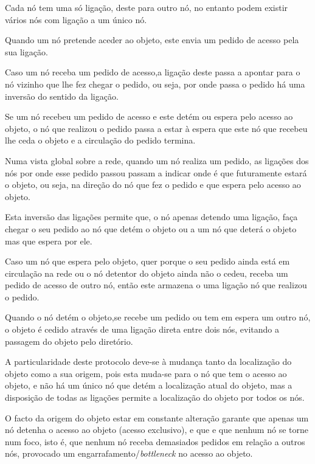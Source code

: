 Cada nó tem uma só ligação, deste para outro nó, no entanto podem existir vários nós com ligação a um único nó.

Quando um nó pretende aceder ao objeto, este envia um pedido de acesso pela sua ligação. 

Caso um nó receba um pedido de acesso,a ligação deste passa a apontar para o nó vizinho que lhe fez chegar o pedido, ou seja, por onde passa o pedido há uma inversão do sentido da ligação.

Se um nó recebeu um pedido de acesso e este detém ou espera pelo acesso ao objeto, o nó que realizou o pedido passa a estar à espera que este nó que recebeu lhe ceda o objeto e a circulação do pedido termina.


Numa vista global sobre a rede, quando um nó realiza um pedido, as ligações dos nós por onde esse pedido passou passam a indicar onde é que futuramente estará o objeto, ou seja, na direção do nó que fez o pedido e que espera pelo acesso ao objeto. 

Esta inversão das ligações permite que, o nó apenas detendo uma ligação, faça chegar o seu pedido ao nó que detém o objeto ou a um nó que deterá o objeto mas que espera por ele.

Caso um nó que espera pelo objeto, quer porque o seu pedido ainda está em circulação na rede ou o nó detentor do objeto ainda não o cedeu, receba um pedido de acesso de outro nó, então este armazena o uma ligação nó que realizou o pedido.

Quando o nó detém o objeto,se recebe um pedido ou tem em espera um outro nó, o objeto é cedido através de uma ligação direta entre dois nós, evitando a passagem do objeto pelo diretório.

A particularidade deste protocolo deve-se à mudança tanto da localização do objeto como a sua origem, pois esta muda-se para o nó que tem o acesso ao objeto, e não há um único nó que detém a localização atual do objeto, mas a disposição de todas as ligações permite a localização do objeto por todos os nós.

O facto da origem do objeto estar em constante alteração garante que apenas um nó detenha o acesso ao objeto (acesso exclusivo), e que e que nenhum nó se torne num foco, isto é, que nenhum nó receba demasiados pedidos em relação a outros nós, provocado um engarrafamento/\emph{bottleneck} no acesso ao objeto.


